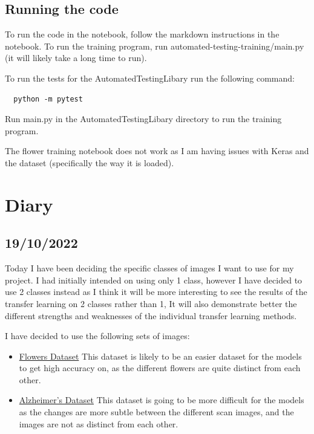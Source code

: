 \documentclass[]{final_report}
\begin{document}
\section{Running the code}
To run the code in the notebook, follow the markdown instructions in the notebook.
To run the training program, run automated-testing-training/main.py (it will likely take a long time to run).

To run the tests for the AutomatedTestingLibary run the following command:
\begin{lstlisting}
  python -m pytest 
\end{lstlisting}
Run main.py in the AutomatedTestingLibary directory to run the training program.

The flower training notebook does not work as I am having issues with Keras and the dataset (specifically the way it is loaded).

\chapter{Diary}


\section*{19/10/2022}

Today I have been deciding the specific classes of images I want to use for my project.
I had initially intended on using only 1 class, however I have decided to use 2 classes instead as I think it will be more interesting to see the results of the transfer learning on 2 classes rather than 1,
It will also demonstrate better the different strengths and weaknesses of the individual transfer learning methods.

I have decided to use the following sets of images:

\begin{itemize}
  \item \href{https://storage.googleapis.com/download.tensorflow.org/example_images/flower_photos.tgz}{Flowers Dataset} 
	This dataset is likely to be an easier dataset for the models to get high accuracy on, as the different flowers are quite distinct from each other.
  \item  \href{https://www.kaggle.com/datasets/uraninjo/augmented-alzheimer-mri-dataset}{Alzheimer's Dataset}
	This dataset is going to be more difficult for the models as the changes are more subtle between the different scan images, and the images are not as distinct from each other.
\end{itemize}
\end{document}
